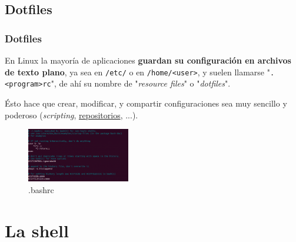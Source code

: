 \documentclass[aspectratio=43]{beamer}
\begin{document}
\subsection{Dotfiles}

\begin{frame}
    \frametitle{Dotfiles}
    En Linux la mayoría de aplicaciones \textbf{guardan su configuración en archivos de texto plano}, ya sea en \texttt{/etc/} o en \texttt{/home/<user>}, y suelen llamarse "\texttt{.<program>rc}", de ahí su nombre de "\textit{resource files}" o "\textit{dotfiles}".\newline

    Ésto hace que crear, modificar, y compartir configuraciones sea muy sencillo y poderoso (\textit{scripting}, \href{https://github.com/rajayonin/dotfiles}{repositorios}, ...).

    \begin{figure}
        \centering
        \includegraphics[width=0.4\textwidth]{img/bashrc.png}
        \caption{.bashrc}
    \end{figure}


\end{frame}


\section{La shell}
\end{document}
